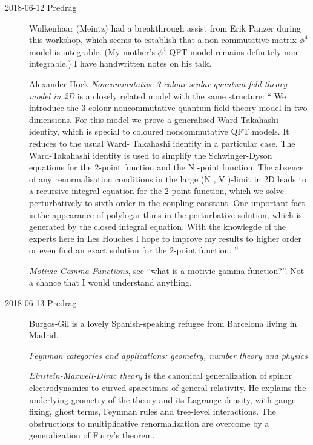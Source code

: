 \begin{description}
\item[2018-06-12 Predrag]

Wulkenhaar (Meintz) had a breakthrough assist from Erik Panzer
during this workshop, which seems to establish that a non-commutative
matrix $\phi^4$ model is integrable. (My mother's $\phi^4$ QFT model
remains definitely non-integrable.) I have handwritten notes on his talk.

Alexander Hock
{\em Noncommutative 3-colour scalar quantum feld theory model in 2D}
is a closely related model with the same structure: ``
We introduce the 3-colour noncommutative quantum field theory model in two
dimensions. For this model we prove a generalised Ward-Takahashi
identity, which is special to coloured noncommutative QFT models. It
reduces to the usual Ward- Takahashi identity in a particular case. The
Ward-Takahashi identity is used to simplify the Schwinger-Dyson equations
for the 2-point function and the N -point function. The absence of any
renormalisation conditions in the large (N , V )-limit in 2D leads to a
recursive integral equation for the 2-point function, which we solve
perturbatively to sixth order in the coupling constant. One important
fact is the appearance of polylogarithms in the perturbative solution,
which is generated by the closed integral equation. With the knowlegde of
the experts here in Les Houches I hope to improve my results to higher
order or even find an exact solution for the 2-point function.
''

{\em Motivic Gamma Functions}, see ``what is a
{motivic gamma function?}''. Not a chance that I would understand anything.

\item[2018-06-13 Predrag]

Burgos-Gil is a lovely Spanish-speaking refugee from Barcelona living in
Madrid.

 {\em Feynman categories and applications:
geometry, number theory and physics}

 {\em Einstein-Maxwell-Dirac theory} is the canonical
generalization of spinor electrodynamics to curved spacetimes of general
relativity. He explains the underlying geometry of the theory and its
Lagrange density, with gauge fixing, ghost terms, Feynman rules and
tree-level interactions. The obstructions to multiplicative
renormalization are overcome by a generalization of Furry's theorem.


\end{description}

